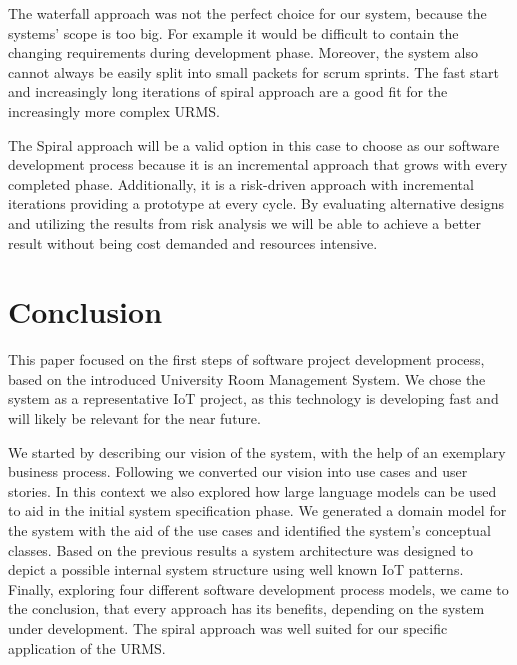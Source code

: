 \documentclass[conference,onecolumn]{IEEEtran}
\begin{document}

The waterfall approach was not the perfect choice for our system, because the systems' scope is too big. For example it would be difficult to contain the changing requirements during development phase.
Moreover, the system also cannot always be easily split into small packets for scrum sprints.
The fast start and increasingly long iterations of spiral approach are a good fit for the increasingly more complex URMS.

The Spiral approach will be a valid option in this case to choose as our software development process because it is an incremental approach that grows with every completed phase. Additionally, it is a risk-driven approach with incremental iterations providing a prototype at every cycle. By evaluating alternative designs and utilizing the results from risk analysis we will be able to achieve a better result without being cost demanded and resources intensive.

\section{Conclusion}

This paper focused on the first steps of software project development process, based on the introduced University Room Management System.
We chose the system as a representative IoT project, as this technology is developing fast and will likely be relevant for the near future.

We started by describing our vision of the system, with the help of an exemplary business process.
Following we converted our vision into use cases and user stories.
In this context we also explored how large language models can be used to aid in the initial system specification phase.
We generated a domain model for the system with the aid of the use cases and identified the system's conceptual classes.
Based on the previous results a system architecture was designed to depict a possible internal system structure using well known IoT patterns.
Finally, exploring four different software development process models, we came to the conclusion, that every approach has its benefits, depending on the system under development. The spiral approach was well suited for our specific application of the URMS.
\end{document}
